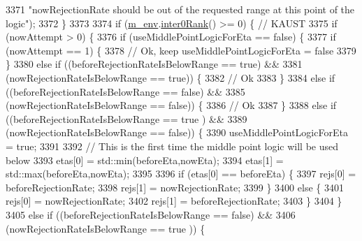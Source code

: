 \begin{DoxyCode}
3371                               \textcolor{stringliteral}{"nowRejectionRate should be out of the requested range at this point of the
       logic"});
3372         \}
3373 
3374         \textcolor{keywordflow}{if} (\hyperlink{class_q_u_e_s_o_1_1_m_l_sampling_a13f1ca4fe9f94822fe572a743eaced1d}{m\_env}.\hyperlink{class_q_u_e_s_o_1_1_base_environment_ae106b5bb8a80b655b88b3a26b1e7c185}{inter0Rank}() >= 0) \{ \textcolor{comment}{// KAUST}
3375           \textcolor{keywordflow}{if} (nowAttempt > 0) \{
3376             \textcolor{keywordflow}{if} (useMiddlePointLogicForEta == \textcolor{keyword}{false}) \{
3377               \textcolor{keywordflow}{if} (nowAttempt == 1) \{
3378                 \textcolor{comment}{// Ok, keep useMiddlePointLogicForEta = false}
3379               \}
3380               \textcolor{keywordflow}{else} \textcolor{keywordflow}{if} ((beforeRejectionRateIsBelowRange == \textcolor{keyword}{true}) &&
3381                        (nowRejectionRateIsBelowRange    == \textcolor{keyword}{true})) \{
3382                 \textcolor{comment}{// Ok}
3383               \}
3384               \textcolor{keywordflow}{else} \textcolor{keywordflow}{if} ((beforeRejectionRateIsBelowRange == \textcolor{keyword}{false}) &&
3385                        (nowRejectionRateIsBelowRange    == \textcolor{keyword}{false})) \{
3386                 \textcolor{comment}{// Ok}
3387               \}
3388               \textcolor{keywordflow}{else} \textcolor{keywordflow}{if} ((beforeRejectionRateIsBelowRange == \textcolor{keyword}{true} ) &&
3389                        (nowRejectionRateIsBelowRange    == \textcolor{keyword}{false})) \{
3390                 useMiddlePointLogicForEta = \textcolor{keyword}{true};
3391 
3392                 \textcolor{comment}{// This is the first time the middle point logic will be used below}
3393                 etas[0] = std::min(beforeEta,nowEta);
3394                 etas[1] = std::max(beforeEta,nowEta);
3395 
3396                 \textcolor{keywordflow}{if} (etas[0] == beforeEta) \{
3397                   rejs[0] = beforeRejectionRate;
3398                   rejs[1] = nowRejectionRate;
3399                 \}
3400                 \textcolor{keywordflow}{else} \{
3401                   rejs[0] = nowRejectionRate;
3402                   rejs[1] = beforeRejectionRate;
3403                 \}
3404               \}
3405               \textcolor{keywordflow}{else} \textcolor{keywordflow}{if} ((beforeRejectionRateIsBelowRange == \textcolor{keyword}{false}) &&
3406                        (nowRejectionRateIsBelowRange    == \textcolor{keyword}{true} )) \{

\end{DoxyCode}
